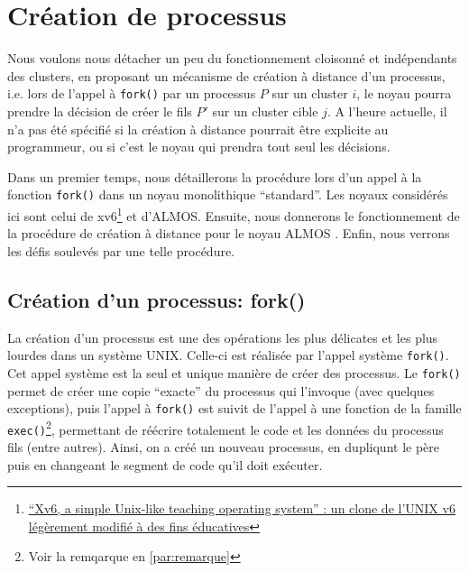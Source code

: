\section{Création de processus}
\label{sec:creation}

  Nous voulons nous détacher un peu du fonctionnement cloisonné et indépendants
  des clusters, en proposant un mécanisme de création à distance d'un processus,
  i.e. lors de l'appel à \texttt{fork()} par un processus $P$ sur un cluster
  $i$, le noyau pourra prendre la décision de créer le fils $P'$ sur un cluster
  cible $j$. A l'heure actuelle, il n'a pas été spécifié si la création à
  distance pourrait être explicite au programmeur, ou si c'est le noyau qui
  prendra tout seul les décisions.

  Dans un premier temps, nous détaillerons la procédure lors d'un appel à la
  fonction \texttt{fork()} dans un noyau monolithique ``standard''. Les noyaux
  considérés ici sont celui de
  xv6\footnote{\href{http://pdos.csail.mit.edu/6.828/2014/xv6.html}{``Xv6, a
      simple Unix-like teaching operating system'' : un clone de l'UNIX v6
      légèrement modifié à des fins éducatives}} et d'ALMOS. Ensuite, nous
  donnerons le fonctionnement de la procédure de création à distance pour le
  noyau ALMOS . Enfin, nous verrons les défis soulevés par une telle procédure.


  \subsection{Création d'un processus: fork()}
  \label{subsec:fork}

    La création d'un processus est une des opérations les plus délicates et les
    plus lourdes dans un système UNIX. Celle-ci est réalisée par l'appel système
    \texttt{fork()}. Cet appel système est la seul et unique manière de créer
    des processus. Le \texttt{fork()} permet de créer une copie ``exacte'' du
    processus qui l'invoque (avec quelques exceptions), puis l'appel à
    \texttt{fork()} est suivit de l'appel à une fonction de la famille
    \texttt{exec()}\footnote{Voir la remqarque en \ref{par:remarque}},
    permettant de réécrire totalement le code et les données du processus fils
    (entre autres). Ainsi, on a créé un nouveau processus, en dupliqunt le père
    puis en changeant le segment de code qu'il doit exécuter.

